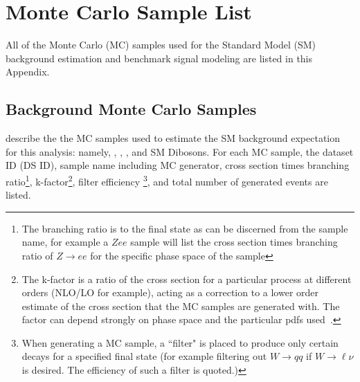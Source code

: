 \chapter{Monte Carlo Sample List}
\label{ch:samples}

All of the Monte Carlo (MC) samples used for the Standard Model (SM) background estimation and benchmark signal modeling are listed in this Appendix.


\section{Background Monte Carlo Samples}
\Tabrange{\ref{tabular:mc_samples_Wenujets}}{\ref{tabular:mc_samples_diboson}} describe the the MC samples used to 
estimate the SM background expectation for this analysis: namely, \Wjets, \ttbar, \Zjets, \Singlet and SM Dibosons. 
For each MC sample, the dataset ID (DS ID), sample name including MC generator, cross section times branching ratio\footnote{
	The branching ratio is to the final state as can be discerned from the sample name, for example a $Zee$ sample will list the cross section times branching ratio of $Z\rightarrow ee$ for the specific phase space of the sample
}, k-factor\footnote{
	The k-factor is a ratio of the cross section for a particular process at different orders (NLO/LO for example), acting as a correction to a lower order estimate of the cross section that the MC samples are generated with. The factor can depend strongly on phase space and the particular pdfs used~\cite{Kfactors}. 
	}, filter efficiency \footnote{
	When generating a MC sample, a ``filter" is placed to produce only certain decays for a specified final state (for example filtering out $W\rightarrow qq$ if $W\rightarrow \ell\nu$ is desired. The efficiency of such a filter is quoted.)
		}, and total number of generated events are listed. 

